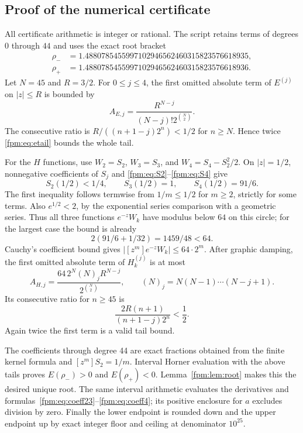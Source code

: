 \documentclass[11pt]{article}
\theoremstyle{definition}\newtheorem{definition}[theorem]{Definition}
\theoremstyle{remark}\newtheorem{remark}[theorem]{Remark}
\begin{document}
\subsection{Proof of the numerical certificate}\label{fpm:sec:certproof}
All certificate arithmetic is integer or rational. The script retains terms of degrees $0$ through $44$ and uses the exact root bracket
\begin{align*}
 \rho_-&=1.4880785455997102946562460315823576618935,\\
 \rho_+&=1.4880785455997102946562460315823576618936.
\end{align*}
Let $N=45$ and $R=3/2$. For $0\le j\le4$, the first omitted absolute term of $E^{(j)}$ on $|z|\le R$ is bounded by
\begin{equation}\label{fpm:eq:etail}
 A_{E,j}=\frac{R^{N-j}}{(N-j)!2^{\binom N2}}.
\end{equation}
The consecutive ratio is $R/((n+1-j)2^n)<1/2$ for $n\ge N$. Hence twice \eqref{fpm:eq:etail} bounds the whole tail.

For the $H$ functions, use $W_2=S_2$, $W_3=S_3$, and $W_4=S_4-S_2^2/2$. On $|z|=1/2$, nonnegative coefficients of $S_j$ and \eqref{fpm:eq:S2}--\eqref{fpm:eq:S4} give
\[
 S_2(1/2)<1/4,\qquad S_3(1/2)=1,\qquad S_4(1/2)=91/6.
\]
The first inequality follows termwise from $1/m\le1/2$ for $m\ge2$, strictly for some terms. Also $e^{1/2}<2$, by the exponential series comparison with a geometric series. Thus all three functions $e^{-z}W_k$ have modulus below $64$ on this circle; for the largest case the bound is already
\[
 2(91/6+1/32)=1459/48<64.
\]
Cauchy's coefficient bound gives $|[z^m]e^{-z}W_k|\le64\cdot2^m$. After graphic damping, the first omitted absolute term of $H_k^{(j)}$ is at most
\begin{equation}\label{fpm:eq:htail}
 A_{H,j}=\frac{64\,2^N(N)_jR^{N-j}}{2^{\binom N2}},
 \qquad (N)_j=N(N-1)\cdots(N-j+1).
\end{equation}
Its consecutive ratio for $n\ge45$ is
\[
 \frac{2R(n+1)}{(n+1-j)2^n}<\frac12.
\]
Again twice the first term is a valid tail bound.

The coefficients through degree 44 are exact fractions obtained from the finite kernel formula and $[z^m]S_2=1/m$. Interval Horner evaluation with the above tails proves $E(\rho_-)>0$ and $E(\rho_+)<0$. Lemma~\ref{fpm:lem:root} makes this the desired unique root. The same interval arithmetic evaluates the derivatives and formulas~\eqref{fpm:eq:coeff23}--\eqref{fpm:eq:coeff4}; its positive enclosure for $a$ excludes division by zero. Finally the lower endpoint is rounded down and the upper endpoint up by exact integer floor and ceiling at denominator $10^{25}$.
\end{document}

